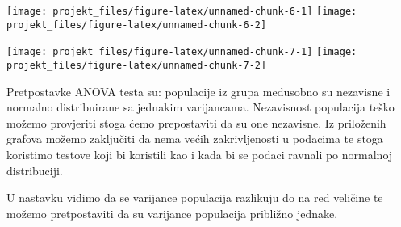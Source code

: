 \documentclass[
]{article}
\newenvironment{Shaded}{\begin{snugshade}}{\end{snugshade}}
\newcommand{\DataTypeTok}[1]{\textcolor[rgb]{0.13,0.29,0.53}{#1}}
\newcommand{\KeywordTok}[1]{\textcolor[rgb]{0.13,0.29,0.53}{\textbf{#1}}}
\newcommand{\NormalTok}[1]{#1}
\newcommand{\OperatorTok}[1]{\textcolor[rgb]{0.81,0.36,0.00}{\textbf{#1}}}
\newcommand{\StringTok}[1]{\textcolor[rgb]{0.31,0.60,0.02}{#1}}
\begin{document}
\texttt{[image: projekt\_files/figure-latex/unnamed-chunk-6-1]}
\texttt{[image: projekt\_files/figure-latex/unnamed-chunk-6-2]}

\begin{Shaded}
\end{Shaded}

\texttt{[image: projekt\_files/figure-latex/unnamed-chunk-7-1]}
\texttt{[image: projekt\_files/figure-latex/unnamed-chunk-7-2]}

Pretpostavke ANOVA testa su: populacije iz grupa međusobno su nezavisne
i normalno distribuirane sa jednakim varijancama. Nezavisnost populacija
teško možemo provjeriti stoga ćemo prepostaviti da su one nezavisne. Iz
priloženih grafova možemo zaključiti da nema većih zakrivljenosti u
podacima te stoga koristimo testove koji bi koristili kao i kada bi se
podaci ravnali po normalnoj distribuciji.

U nastavku vidimo da se varijance populacija razlikuju do na red
veličine te možemo pretpostaviti da su varijance populacija približno
jednake.

\begin{Shaded}
\end{Shaded}
\end{document}
